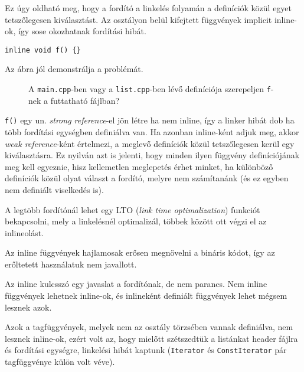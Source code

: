 \documentclass[../cpp_book/cpp_book.tex]{subfiles}
\begin{document}
	Ez úgy oldható meg, hogy a fordító a linkelés folyamán a definíciók közül egyet tetszőlegesen kiválasztást. Az osztályon belül kifejtett függvények implicit inline-ok, így sose okozhatnak fordítási hibát.
	\begin{lstlisting}
inline void f() {}
	\end{lstlisting}
	Az ábra jól demonstrálja a problémát.
	\begin{figure}[h]
		\centering
		
		
		\caption{A \texttt{main.cpp}-ben vagy a \texttt{list.cpp}-ben lévő definíciója szerepeljen \texttt{f}-nek a futtatható fájlban?}
	\end{figure}
	\texttt{f()} egy un. \textit{strong reference}-el jön létre ha nem inline, így a linker hibát dob ha több fordítási egységben definiálva van. Ha azonban inline-ként adjuk meg, akkor  \textit{weak reference}-ként értelmezi, a meglevő definíciók közül tetszőlegesen kerül egy kiválasztásra. Ez nyilván azt is jelenti, hogy minden ilyen függvény definíciójának meg kell egyeznie, hisz kellemetlen meglepetés érhet minket, ha különböző definíciók közül olyat választ a fordító, melyre nem számítanánk (és ez egyben nem definiált viselkedés is).
	\begin{note}
		A legtöbb fordítónál lehet egy LTO (\textit{link time optimalization}) funkciót bekapcsolni, mely a linkelésnél optimalizál, többek között ott végzi el az inlineolást.
	\end{note}
	\begin{note}
		Az inline függvények hajlamosak erősen megnövelni a bináris kódot, így az erőltetett használatuk nem javallott.
	\end{note}
	\begin{note}
		Az inline kulcsszó egy javaslat a fordítónak, de nem parancs. Nem inline függvények lehetnek inline-ok, és inlineként definiált függvények lehet mégsem lesznek azok.
	\end{note}
	Azok a tagfüggvények, melyek nem az osztály törzsében vannak definiálva, nem lesznek inline-ok, ezért volt az, hogy mielőtt szétszedtük a listánkat header fájlra és fordítási egységre, linkelési hibát kaptunk (\texttt{Iterator} és \texttt{ConstIterator} pár tagfüggvénye külön volt véve).
	\medskip
	
\end{document}
